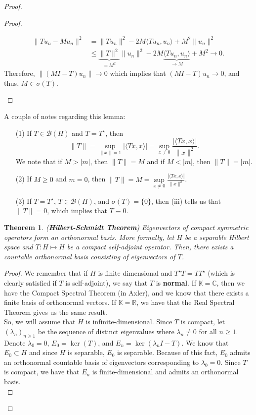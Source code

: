 \documentclass[oneside]{book}
\newtheorem{theorem}{Theorem}
\newcommand{\R}{{\mathbb R}}
\newcommand{\C}{{\mathbb C}}
\def\K{\mathbb{K}}
\newcommand{\B}{\mathscr{B}}
\newcommand{\fd}{{\text{finite-dimensional}}}
\newcommand{\la}{\langle}
\newcommand{\ra}{\rangle}
\newcommand{\sbs}{\subset}
\newcommand{\Ts}{T^{\star}}
\begin{document}
\begin{proof}
\begin{proof}
\begin{enumerate}
\begin{align*}
\| Tu_n - M u_n \|^2 &= \| Tu_n \|^2 - 2M \la Tu_n , u_n \ra + M^2 \| u_n \|^2 \\
& \leq \underbrace{\| T \|^2}_{= M^2} \| u_n \|^2 - 2M \underbrace{\la Tu_n, u_n\ra}_{\to M} + M^2 \to 0. 
\end{align*}
Therefore, $\| (MI - T)u_n \| \to 0$ which implies that $(MI - T)u_n \to 0$, and thus, $M \in \sigma(T)$. 
\end{enumerate}
\end{proof}
A couple of notes regarding this lemma:
\begin{enumerate}
\item[(1)] If $T \in \B(H)$ and $T = \Ts$, then 
\[ \| T \| = \sup\limits_{\| x \| = 1 } |\la Tx, x \ra | = \sup\limits_{x \neq 0} \frac{|\la Tx, x \ra |}{\| x \|^2}. \] We note that if $M > |m|$, then $\| T \| = M$ and if $M < |m|$, then $\| T \| = |m|$.
\item[(2)] If $M \geq 0$ and $m = 0$, then $\| T \| = M = \sup\limits_{x \neq 0} \frac{|\la Tx, x \ra|}{\| x \|^2}$. 
\item[(3)] If $ T = \Ts$, $T \in \B(H)$, and $\sigma(T) = \{ 0 \}$, then (iii) tells us that $\| T \| = 0$, which implies that $T \equiv 0$. 
\end{enumerate}
\begin{theorem} (\textbf{Hilbert-Schmidt Theorem})
Eigenvectors of compact symmetric operators form an orthonormal basis. More formally, let $H$ be a separable Hilbert space and $T: H \mapsto H$ be a compact self-adjoint operator. Then, there exists a countable orthonormal basis consisting of eigenvectors of $T$. 
\end{theorem}
\begin{proof}
We remember that if $H$ is finite dimensional and $\Ts T = T \Ts$ (which is clearly satisfied if $T$ is self-adjoint), we say that $T$ is \textbf{normal}. If $\K = \C$, then we have the Compact Spectral Theorem (in Axler), and we know that there exists a finite basis of orthonormal vectors. If $\K = \R$, we have that the Real Spectral Theorem gives us the same result. \\
\indent So, we will assume that $H$ is in$\fd$. Since $T$ is compact, let $(\lambda_n)_{n \geq 1}$ be the sequence of distinct eigenvalues where $\lambda_n \neq 0$ for all $n \geq 1$. Denote $\lambda_0 = 0$, $E_0 = \ker(T)$, and $E_n = \ker(\lambda_n I - T)$. We know that $E_0 \sbs H$ and since $H$ is separable, $E_0$ is separable. Because of this fact, $E_0$ admits an orthonormal countable basis of eigenvectors corresponding to $\lambda_0 = 0$. Since $T$ is compact, we have that $E_n$ is $\fd$ and admits an orthonormal basis. \\

\end{proof}
\end{proof}
\end{document}

